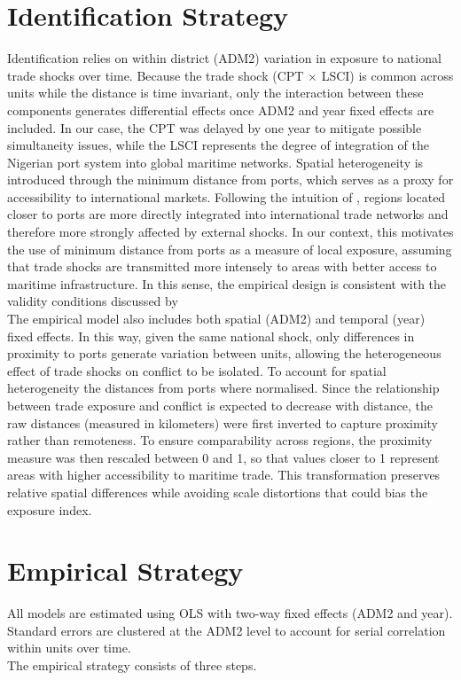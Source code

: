 \section{Identification Strategy}
Identification relies on within district (ADM2) variation in exposure to national trade shocks over time. Because the trade shock (CPT × LSCI) is common across units while the distance is time invariant, only the interaction between these components generates differential effects once ADM2 and year fixed effects are included. 
In our case, the CPT was delayed by one year to mitigate possible simultaneity issues, while the LSCI represents the degree of integration of the Nigerian port system into global maritime networks. Spatial heterogeneity is introduced through the minimum distance from ports, which serves as a proxy for accessibility to international markets. Following the intuition of \parencite{berman2015external}, regions located closer to ports are more directly integrated into international trade networks and therefore more strongly affected by external shocks. In our context, this motivates the use of minimum distance from ports as a measure of local exposure, assuming that trade shocks are transmitted more intensely to areas with better access to maritime infrastructure.
In this sense, the empirical design is consistent with the validity conditions discussed by \parencite{goldsmith2020bartik}\\
The empirical model also includes both spatial (ADM2) and temporal (year) fixed effects. In this way, given the same national shock, only differences in proximity to ports generate variation between units, allowing the heterogeneous effect of trade shocks on conflict to be isolated. 
To account for spatial heterogeneity the distances from ports where normalised. Since the relationship between trade exposure and conflict is expected to decrease with distance, the raw distances (measured in kilometers) were first inverted to capture proximity rather than remoteness. To ensure comparability across regions, the proximity measure was then rescaled between 0 and 1, so that values closer to 1 represent areas with higher accessibility to maritime trade. This transformation preserves relative spatial differences while avoiding scale distortions that could bias the exposure index.

\section{Empirical Strategy}
All models are estimated using OLS with two-way fixed effects (ADM2 and year). Standard errors are clustered at the ADM2 level to account for serial correlation within units over time. \\
The empirical strategy consists of three steps.\\

